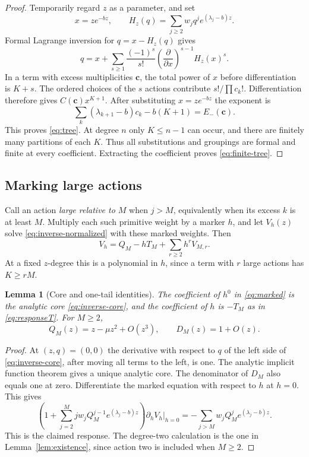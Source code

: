 \documentclass[11pt,a4paper]{article}
\numberwithin{equation}{section}
\newtheorem{lemma}[theorem]{Lemma}
\theoremstyle{definition}
\theoremstyle{remark}
\begin{document}
\begin{proof}
Temporarily regard $z$ as a parameter, and set
\[
 x=z e^{-bz},\qquad H_z(q)=\sum_{j\ge2}w_j q^j e^{(\lambda_j-b)z}.
\]
Formal Lagrange inversion for $q=x-H_z(q)$ gives
\[
 q=x+\sum_{s\ge1}\frac{(-1)^s}{s!}
           \left(\frac{\partial}{\partial x}\right)^{s-1}H_z(x)^s.
\]
In a term with excess multiplicities $\mathbf c$, the total power of
$x$ before differentiation is $K+s$. The ordered choices of the $s$
actions contribute $s!/\prod c_k!$. Differentiation therefore gives
$C(\mathbf c)x^{K+1}$. After substituting $x=z e^{-bz}$ the exponent is
\[
 \sum_k(\lambda_{k+1}-b)c_k-b(K+1)=E_-(\mathbf c).
\]
This proves \eqref{eq:tree}. At degree $n$ only $K\le n-1$ can occur,
and there are finitely many partitions of each $K$. Thus all substitutions
and groupings are formal and finite at every coefficient. Extracting the
coefficient proves \eqref{eq:finite-tree}.
\end{proof}

\subsection{Marking large actions}

Call an action \emph{large relative to $M$} when $j>M$, equivalently
when its excess $k$ is at least $M$. Multiply each such primitive weight
by a marker $h$, and let $V_h(z)$ solve \eqref{eq:inverse-normalized}
with these marked weights. Then
\begin{equation}
 V_h=Q_M-hT_M+\sum_{r\ge2}h^r V_{M,r}.
 \label{eq:marked}
\end{equation}
At a fixed $z$-degree this is a polynomial in $h$, since a term with
$r$ large actions has $K\ge rM$.

\begin{lemma}[Core and one-tail identities]
\label{lem:core-response}
The coefficient of $h^0$ in \eqref{eq:marked} is the analytic core
\eqref{eq:inverse-core}, and the coefficient of $h$ is $-T_M$ as in
\eqref{eq:responseT}. For $M\ge2$,
\begin{equation}
 Q_M(z)=z-\mu z^2+O(z^3),\qquad D_M(z)=1+O(z).
 \label{eq:core-jets}
\end{equation}
\end{lemma}

\begin{proof}
At $(z,q)=(0,0)$ the derivative with respect to $q$ of the left side of
\eqref{eq:inverse-core}, after moving all terms to the left, is one.
The analytic implicit function theorem gives a unique analytic core.
The denominator of $D_M$ also equals one at zero. Differentiate the
marked equation with respect to $h$ at $h=0$. This gives
\[
 \left(1+\sum_{j=2}^{M}j w_jQ_M^{j-1}e^{(\lambda_j-b)z}\right)
       \left.\partial_h V_h\right|_{h=0}
 =-\sum_{j>M}w_jQ_M^j e^{(\lambda_j-b)z}.
\]
This is the claimed response. The degree-two calculation is the one in
Lemma~\ref{lem:existence}, since action two is included when $M\ge2$.
\end{proof}
\end{document}
